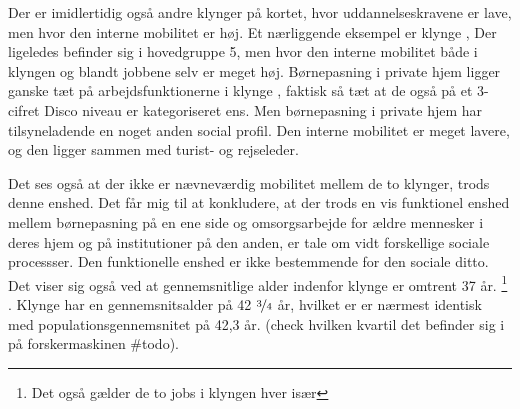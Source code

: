 Der er imidlertidig også andre klynger på kortet, hvor uddannelseskravene er lave, men hvor den interne mobilitet er høj. Et nærliggende eksempel er klynge , Der ligeledes befinder sig i hovedgruppe 5, men hvor den interne mobilitet både i klyngen og blandt jobbene selv er meget høj. Børnepasning i private hjem ligger ganske tæt på arbejdsfunktionerne i klynge , faktisk så tæt at de også på et 3-cifret Disco niveau er kategoriseret ens. Men børnepasning i private hjem har tilsyneladende en noget anden social profil. Den interne mobilitet er meget lavere, og den ligger sammen med turist- og rejseleder. 

Det ses også at der ikke er nævneværdig mobilitet mellem de to klynger, trods denne enshed. Det får mig til at konkludere, at der trods en vis funktionel enshed mellem børnepasning på en ene side og omsorgsarbejde for ældre mennesker i deres hjem og på institutioner på den anden, er tale om vidt forskellige sociale processser. Den funktionelle enshed er ikke bestemmende for den sociale ditto. Det viser sig også ved at gennemsnitlige alder indenfor klynge  er omtrent 37 år.%
%
\footnote{Det også gælder de to jobs i klyngen hver især}%
%
. Klynge  har en gennemsnitsalder på 42 $\nicefrac{3}{4}$ år, hvilket er er nærmest identisk med populationsgennemsnitet på 42,3 år. (check hvilken kvartil det befinder sig i på forskermaskinen \#todo). 






















